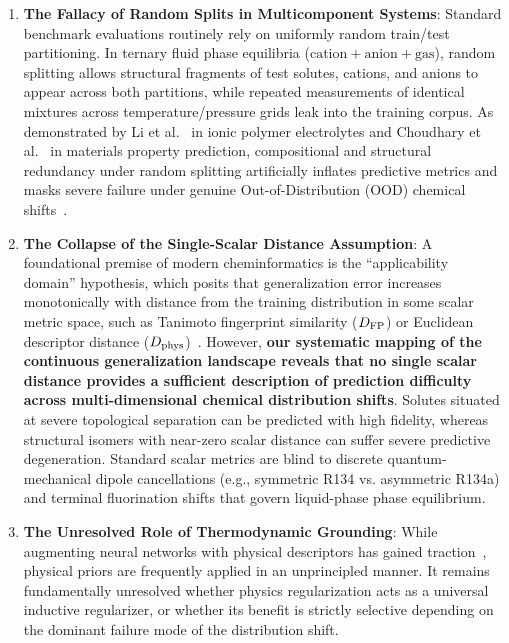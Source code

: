 \begin{enumerate}
    \item \textbf{The Fallacy of Random Splits in Multicomponent Systems}: Standard benchmark evaluations routinely rely on uniformly random train/test partitioning. In ternary fluid phase equilibria ($\text{cation} + \text{anion} + \text{gas}$), random splitting allows structural fragments of test solutes, cations, and anions to appear across both partitions, while repeated measurements of identical mixtures across temperature/pressure grids leak into the training corpus. As demonstrated by Li et al.~\cite{Li2023_NatCommun} in ionic polymer electrolytes and Choudhary et al.~\cite{Choudhary2024_OODBenchmark} in materials property prediction, compositional and structural redundancy under random splitting artificially inflates predictive metrics and masks severe failure under genuine Out-of-Distribution (OOD) chemical shifts~\cite{Wu2018_MoleculeNet}.
    
    \item \textbf{The Collapse of the Single-Scalar Distance Assumption}: A foundational premise of modern cheminformatics is the ``applicability domain'' hypothesis, which posits that generalization error increases monotonically with distance from the training distribution in some scalar metric space, such as Tanimoto fingerprint similarity ($D_{\rm FP}$) or Euclidean descriptor distance ($D_{\rm phys}$)~\cite{Tropsha2003_QsarValidation,Netzeva2005_ApplicabilityDomain}. However, \textbf{our systematic mapping of the continuous generalization landscape reveals that no single scalar distance provides a sufficient description of prediction difficulty across multi-dimensional chemical distribution shifts}. Solutes situated at severe topological separation can be predicted with high fidelity, whereas structural isomers with near-zero scalar distance can suffer severe predictive degeneration. Standard scalar metrics are blind to discrete quantum-mechanical dipole cancellations (e.g., symmetric R134 vs. asymmetric R134a) and terminal fluorination shifts that govern liquid-phase phase equilibrium.
    
    \item \textbf{The Unresolved Role of Thermodynamic Grounding}: While augmenting neural networks with physical descriptors has gained traction~\cite{Karpatne2017_PGML,Karniadakis2021_PINN_Review}, physical priors are frequently applied in an unprincipled manner. It remains fundamentally unresolved whether physics regularization acts as a universal inductive regularizer, or whether its benefit is strictly selective depending on the dominant failure mode of the distribution shift.
    

\end{enumerate}

